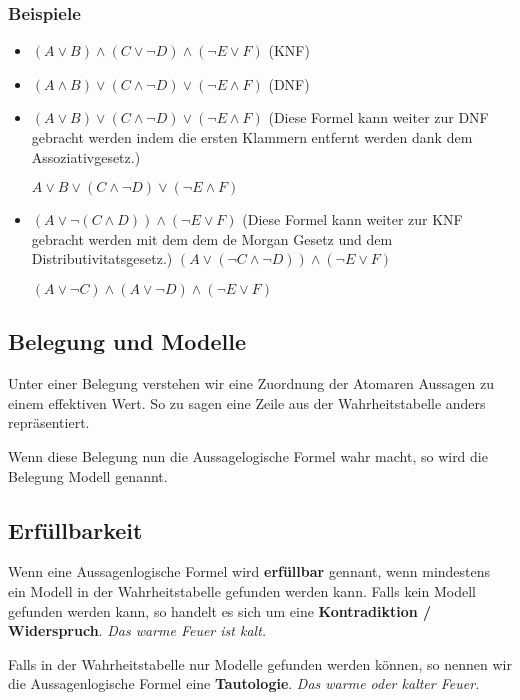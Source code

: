 \documentclass[a4paper,12pt]{article}
\begin{document}
\subsubsection{Beispiele}
\begin{itemize}
  \item \((A \lor B) \land (C \lor \neg D) \land (\neg E \lor F)  \) (KNF)
  \item \((A \land B) \lor (C \land \neg D) \lor (\neg E \land F)  \) (DNF)
  \item \((A \lor B) \lor (C \land \neg D) \lor (\neg E \land F)  \) (Diese Formel kann weiter zur DNF gebracht werden indem die ersten Klammern entfernt werden dank dem Assoziativgesetz.)
  	
  	 \(A \lor B \lor (C \land \neg D) \lor (\neg E \land F)  \)
  \item \((A \lor \neg (C \land D)) \land (\neg E \lor F)  \) (Diese Formel kann weiter zur KNF gebracht werden mit dem dem de Morgan Gesetz und dem Distributivitatsgesetz.)
 	\((A \lor (\neg C \land \neg D)) \land (\neg E \lor F)  \)
 	
  	\( (A \lor \neg C) \land (A \lor \neg D) \land (\neg E \lor F)  \)
    
\end{itemize}

\subsection{Belegung und Modelle}
Unter einer Belegung verstehen wir eine Zuordnung der Atomaren Aussagen zu einem effektiven Wert. So zu sagen eine Zeile aus der Wahrheitstabelle anders repräsentiert.

Wenn diese Belegung nun die Aussagelogische Formel wahr macht, so wird die Belegung Modell genannt.


\subsection{Erfüllbarkeit}
Wenn eine Aussagenlogische Formel wird \textbf{erfüllbar} gennant, wenn mindestens ein Modell in der Wahrheitstabelle gefunden werden kann. Falls kein Modell gefunden werden kann, so handelt es sich um eine \textbf{Kontradiktion / Widerspruch}. \textit{Das warme Feuer ist kalt.}

Falls in der Wahrheitstabelle nur Modelle gefunden werden können, so nennen wir die Aussagenlogische Formel eine \textbf{Tautologie}. \textit{Das warme oder kalter Feuer.} 
\end{document}
